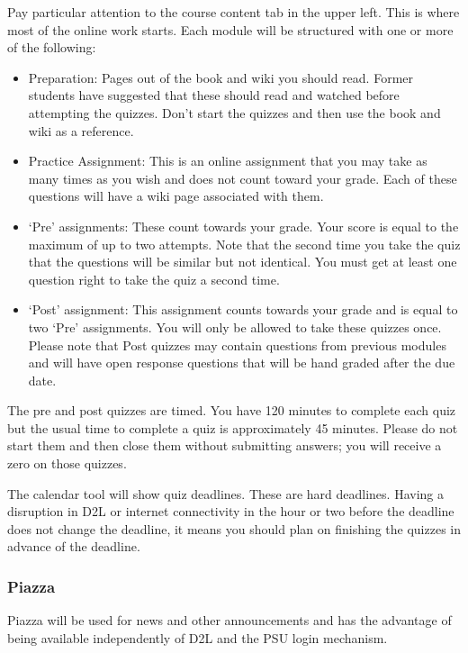 \documentclass[letterpaper,10pt]{article}
\begin{document}
Pay particular attention to the course content tab in the upper
left. This is where most of the online work starts.  Each module will
be structured with one or more of the following:

\begin{itemize}

\item Preparation: Pages out of the book and wiki you should read. Former students have suggested that these should read and watched before attempting the quizzes.  Don't start the quizzes and then use the book and wiki as a reference.
  
  \item Practice Assignment: This is an online assignment that you may take as many times as you wish and does not count toward your grade. Each of these questions will have a wiki page associated with them. 

\item `Pre' assignments: These count towards your grade.
  Your score is equal to the maximum of up to two attempts. Note that the second time you take the quiz that the questions will be similar but not identical. You must get at least one question right to take the quiz a second time.

\item `Post' assignment: This assignment counts
  towards your grade and is equal to two `Pre' assignments.  You will
  only be allowed to take these quizzes once.  Please note that Post quizzes may contain questions from previous modules and will have open response questions that will be hand graded after the due date.

 
\end{itemize}

 The pre and post quizzes are timed. You have 120 minutes to complete each quiz but the usual time to complete a quiz is approximately 45 minutes.  Please do not start them and
  then close them without submitting answers; you will receive a zero on those quizzes.  

The calendar tool will show quiz deadlines. These are hard deadlines.  Having a disruption in D2L or internet connectivity in the hour or two before the deadline does not change the deadline, it means you should plan on finishing the quizzes in advance of the deadline.

\subsubsection{Piazza}
Piazza will be used for news and other announcements and has the advantage of being available independently of D2L and the PSU login mechanism.  
\end{document}
